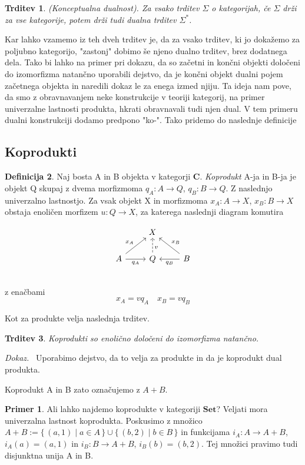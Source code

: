 \documentclass[12pt,a4paper]{book}
\theoremstyle{definition}
\newtheorem{definicija}{Definicija}[chapter]
\theoremstyle{plain}
\newtheorem{trditev}[definicija]{Trditev}
\newenvironment{dokaz}{\emph{Dokaz.}\ }{\hspace{\fill}{$\Box$}}
\theoremstyle{definition}
\newtheorem{primer}{Primer}[section]
\theoremstyle{remark}
\newcommand{\cat}[1]{\textbf{#1}}
\renewcommand{\set}[1]{\{\,#1\,\}}
\begin{document}
\begin{trditev} \textit{(Konceptualna dualnost)}.
Za vsako trditev $\Sigma$ o kategorijah, če $\Sigma$ drži za vse kategorije, potem drži tudi dualna trditev $\Sigma^*$.
\end{trditev}

Kar lahko vzamemo iz teh dveh trditev je, da za vsako trditev, ki jo dokažemo za poljubno kategorijo, "zastonj" dobimo še njeno dualno trditev, brez dodatnega dela. Tako bi lahko na primer pri dokazu, da so začetni in končni objekti določeni do izomorfizma natančno uporabili dejstvo, da je končni objekt dualni pojem začetnega objekta in naredili dokaz le za enega izmed njiju.
Ta ideja nam pove, da smo z obravnavanjem neke konstrukcije v teoriji kategorij, na primer univerzalne lastnosti produkta, hkrati obravnavali tudi njen dual. V tem primeru dualni konstrukciji dodamo predpono "ko-". Tako pridemo do naslednje definicije

\subsection{Koprodukti}
\begin{definicija}
Naj bosta A in B objekta v kategorji $\cat{C}$. \textit{Koprodukt} A-ja in B-ja je objekt Q skupaj z dvema morfizmoma $q_A : A \to Q$, $q_B : B \to Q$. Z naslednjo univerzalno lastnostjo. Za vsak objekt X in morfizmoma $x_A : A \to X$, $x_B : B \to X$ obstaja enoličen morfizem $u : Q \to X$, za katerega naslednji diagram komutira

$$\begin{tikzcd}
& X & \\
A \ar[ur, "x_A"] \ar[r, "q_A"'] & Q \ar[u, dashed, pos=0.35, "v"']  & B \ar[l, "q_B"] \ar[ul, "x_B"'] \\
\end{tikzcd}$$
z enačbami
$$x_A = v q_A \quad x_B = v q_B$$
\end{definicija}
Kot za produkte velja naslednja trditev.
\begin{trditev}
Koprodukti so enolično določeni do izomorfizma natančno.
\end{trditev}
\begin{dokaz}
Uporabimo dejstvo, da to velja za produkte in da je koprodukt dual produkta.
\end{dokaz}

Koprodukt A in B zato označujemo z $A + B$.
\begin{primer}
Ali lahko najdemo koprodukte v kategoriji $\cat{Set}$? 
Veljati mora univerzalna lastnost koprodukta.
Poskusimo z množico $A+B := \set{(a,1) \mid a \in A} \cup \set{(b,2) \mid b \in B}$ in funkcijama $i_A : A \to A + B$, $i_A(a) = (a,1)$ in $i_B : B \to A+B$, $i_B(b) = (b,2)$. Tej množici pravimo tudi disjunktna unija A in B.
\end{primer}
\end{document}
